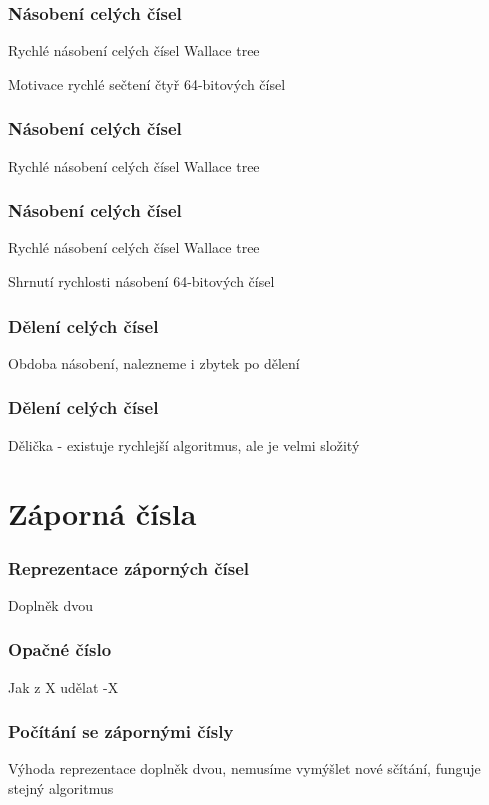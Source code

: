 \documentclass{beamer}
\begin{document}
\begin{frame}
\frametitle{Násobení celých čísel}

Rychlé násobení celých čísel Wallace tree

Motivace rychlé sečtení čtyř 64-bitových čísel
\end{frame}

\begin{frame}
\frametitle{Násobení celých čísel}

Rychlé násobení celých čísel Wallace tree
\end{frame}

\begin{frame}
\frametitle{Násobení celých čísel}

Rychlé násobení celých čísel Wallace tree

Shrnutí rychlosti násobení 64-bitových čísel
\end{frame}


\begin{frame}
\frametitle{Dělení celých čísel}

Obdoba násobení, nalezneme i zbytek po dělení

\end{frame}


\begin{frame}
\frametitle{Dělení celých čísel}

Dělička - existuje rychlejší algoritmus, ale je velmi složitý

\end{frame}


\section{Záporná čísla}
\begin{frame}
\frametitle{Reprezentace záporných čísel}
Doplněk dvou

\end{frame}

\begin{frame}
\frametitle{Opačné číslo}

Jak z X udělat -X

\end{frame}


\begin{frame}
\frametitle{Počítání se zápornými čísly}

Výhoda reprezentace doplněk dvou, nemusíme vymýšlet nové sčítání, funguje stejný algoritmus
\end{frame}
\end{document}
